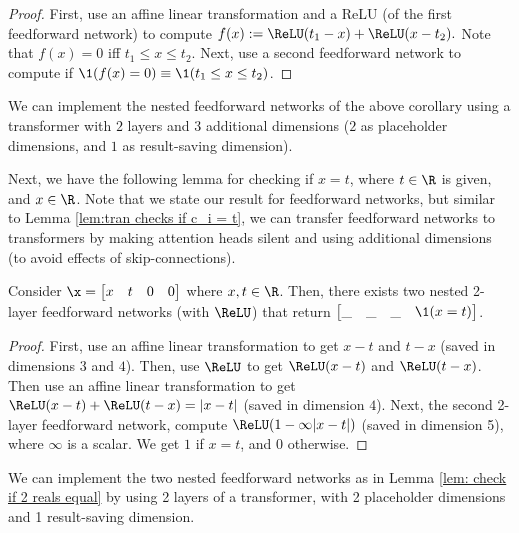 \begin{proof}
    First, use an affine linear transformation and a ReLU (of the first feedforward network) to compute 
    $f(x) := \ReLU(t_1 -x) + \ReLU(x - t_2).$
    Note that $f(x) = 0$ iff $t_1 \leq x \leq t_2$. Next, use a second feedforward network to compute if $\1(f(x) = 0) \equiv \1(t_1 \leq x \leq t_2)$. 
\end{proof}

\begin{remark}
    We can implement the nested feedforward networks of the above corollary using a transformer with $2$ layers and $3$ additional dimensions ($2$ as placeholder dimensions, and $1$ as result-saving dimension).
\end{remark}

Next, we have the following lemma for checking if $x = t$, where $t \in \R$ is given, and $x \in \R$. Note that we state our result for feedforward networks, but similar to Lemma \ref{lem:tran checks if c_i = t}, we can transfer feedforward networks to transformers by making attention heads silent and using additional dimensions (to avoid effects of skip-connections).  

\begin{lemma} \label{lem: check if 2 reals equal}
    Consider $\x = \begin{bmatrix}
        x &t &0 &0 
    \end{bmatrix}$ where $x, t \in \R$. Then, there exists two nested 2-layer feedforward networks (with $\ReLU$) that return $\begin{bmatrix}
        \_ &\_ &\_ &\1(x = t)
    \end{bmatrix}$.
\end{lemma}
\begin{proof}
    First, use an affine linear transformation to get $x - t$ and $t -x $ (saved in dimensions $3$ and $4$). Then, use $\ReLU$ to get $\ReLU(x-t)$ and $\ReLU(t-x)$. Then use an affine linear transformation to get $\ReLU(x-t) + \ReLU(t-x) = |x-t|$ (saved in dimension $4$).  Next, the second 2-layer feedforward network, compute $\ReLU(1 - \infty |x-t|)$ (saved in dimension 5), where $\infty$ is a scalar. We get $1$ if $x = t$, and $0$ otherwise. 
\end{proof}

\begin{remark}
    We can implement the two nested feedforward networks as in Lemma \ref{lem: check if 2 reals equal} by using 2 layers of a transformer, with 2 placeholder dimensions and 1 result-saving dimension. 
\end{remark}

